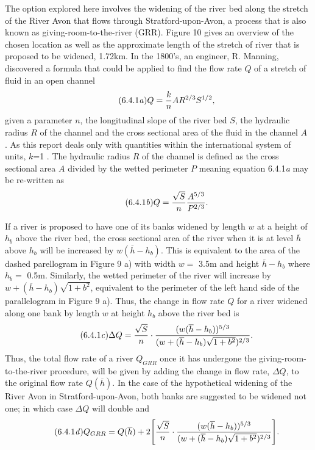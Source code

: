 \documentclass[11pt,a4paper]{article}
\begin{document}
\noindent The option explored here involves the widening of the river bed along the stretch of the River Avon that flows through Stratford-upon-Avon, a process that is also known as giving-room-to-the-river (GRR). Figure 10 gives an overview of the chosen location as well as the approximate length of the stretch of river that is proposed to be widened, 1.72km. In the 1800's, an engineer, R. Manning, discovered a formula that could be applied to find the flow rate $Q$ of a stretch of fluid in an open channel 
\begin{equation}\tag{6.4.1\textit{a}}
Q=\frac{k}{n}AR^{2/3}S^{1/2},
\end{equation}
given a parameter $n$, the longitudinal slope of the river bed $S$, the hydraulic radius $R$ of the channel and the cross sectional area of the fluid in the channel $A$ \cite{manning}. As this report deals only with quantities within the international system of units, $k$=1 \cite{manning}. The hydraulic radius $R$ of the channel is defined as the cross sectional area $A$  divided by the wetted perimeter $P$ meaning equation 6.4.1\textit{a} may be re-written as
\begin{equation}\tag{6.4.1\textit{b}}
Q=\frac{\sqrt{S}}{n}\frac{A^{5/3}}{P^{2/3}}.
\end{equation}

If a river is proposed to have one of its banks widened by length $w$ at a height of $h_b$ above the river bed, the cross sectional area of the river when it is at level $\overline{h}$ above $h_b$ will be increased by $w(\overline{h}-h_b)$. This is equivalent to the area of the dashed parellogram in Figure 9 a) with width $w=$ 3.5m and height $\overline{h}-h_b$ where $h_b=$ 0.5m. Similarly, the wetted perimeter of the river will increase by $w+(\overline{h}-h_b)\sqrt{1+b^2}$, equivalent to the perimeter of the left hand side of the parallelogram in Figure 9 a). Thus, the change in flow rate $Q$ for a river widened along one bank by length $w$ at height $h_b$ above the river bed is
\begin{equation}\tag{6.4.1\textit{c}}
\Delta Q=\frac{\sqrt{S}}{n}\cdot\frac{(w(\overline{h}-h_b))^{5/3}}{(w+(\overline{h}-h_b)\sqrt{1+b^2})^{2/3}}.
\end{equation}
Thus, the total flow rate of a river $Q_{GRR}$ once it has undergone the giving-room-to-the-river procedure, will be given by adding the change in flow rate, $\Delta Q$, to the original flow rate $Q(\overline{h})$. In the case of the hypothetical widening of the River Avon in Stratford-upon-Avon, both banks are suggested to be widened not one{;} in which case $\Delta Q$ will double and
\begin{equation}\tag{6.4.1\textit{d}}
Q_{GRR}=Q(\overline{h})+2\Bigg[\frac{\sqrt{S}}{n}\cdot\frac{(w(\overline{h}-h_b))^{5/3}}{(w+(\overline{h}-h_b)\sqrt{1+b^2})^{2/3}}\Bigg].
\end{equation}
\end{document}
